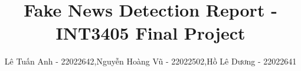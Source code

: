 \documentclass[12pt]{article}
\title{Fake News Detection Report - INT3405 Final Project}
\author{Lê Tuấn Anh - 22022642,Nguyễn Hoàng Vũ - 22022502,Hồ Lê Dương - 22022641}
\date{}
\begin{document}
    \maketitle
    \renewcommand{\contentsname}{\hfill\bfseries\Large Mục lục\hfill}   
    \renewcommand{\cftaftertoctitle}{\hfill}
    \tableofcontents
    \newpage

    
    
    
\end{document}
